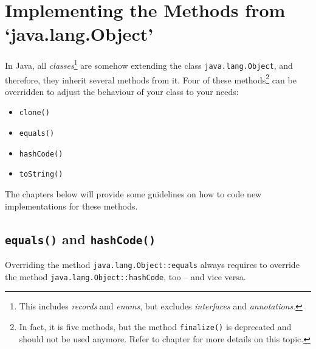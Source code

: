 \section{Implementing the Methods from ‘java.lang.Object’}\label{sec:ImplementObjectMethods}
In Java, all \textit{classes}\footnote{This includes \textit{records} and \textit{enums}, but excludes \textit{interfaces} and \textit{annotations}.} are somehow extending the class \lstinline|java.lang.Object|\autocite{ORACLE_DOC_OBJECT_CLASS}, and therefore, they inherit several methods from it. Four of these methods\footnote{In fact, it is five methods, but the method \lstinline|finalize()|\autocite{ORACLE_DOC_OBJECT:finalize} is deprecated and should not be used anymore. Refer to chapter  for more details on this topic.} can be overridden to adjust the behaviour of your class to your needs:

\begin{itemize}[nosep]
\item{\lstinline|clone()|\autocite{ORACLE_DOC_OBJECT:clone}}

\item{\lstinline|equals()|\autocite{ORACLE_DOC_OBJECT:equals}}

\item{\lstinline|hashCode()|\autocite{ORACLE_DOC_OBJECT:hashCode}}

\item{\lstinline|toString()|\autocite{ORACLE_DOC_OBJECT:toString}}
\end{itemize}

The chapters below will provide some guidelines on how to code new implementations for these methods.


\subsection{\lstinline|equals()| and \lstinline|hashCode()|}\label{sec:EqualsAndHashCode}
Overriding the method \lstinline|java.lang.Object::equals|\autocite{ORACLE_DOC_OBJECT:equals} always requires to override the method \lstinline|java.lang.Object::hashCode|\autocite{ORACLE_DOC_OBJECT:hashCode}, too – and vice versa.

